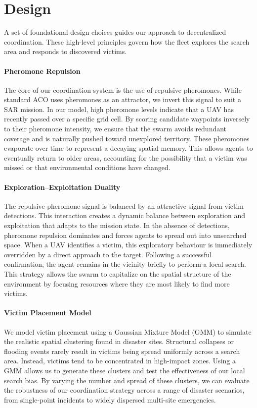 \section{Design}

A set of foundational design choices guides our approach to decentralized coordination. These high-level principles govern how the fleet explores the search area and responds to discovered victims.

\paragraph{Pheromone Repulsion}
The core of our coordination system is the use of repulsive pheromones. While standard ACO \citep{ar:Dorigo1996} uses pheromones as an attractor, we invert this signal to suit a SAR mission. In our model, high pheromone levels indicate that a UAV has recently passed over a specific grid cell. By scoring candidate waypoints inversely to their pheromone intensity, we ensure that the swarm avoids redundant coverage and is naturally pushed toward unexplored territory. These pheromones evaporate over time to represent a decaying spatial memory. This allows agents to eventually return to older areas, accounting for the possibility that a victim was missed or that environmental conditions have changed.

\paragraph{Exploration--Exploitation Duality}
The repulsive pheromone signal is balanced by an attractive signal from victim detections. This interaction creates a dynamic balance between exploration and exploitation that adapts to the mission state. In the absence of detections, pheromone repulsion dominates and forces agents to spread out into unsearched space. When a UAV identifies a victim, this exploratory behaviour is immediately overridden by a direct approach to the target. Following a successful confirmation, the agent remains in the vicinity briefly to perform a local search. This strategy allows the swarm to capitalize on the spatial structure of the environment by focusing resources where they are most likely to find more victims.

\paragraph{Victim Placement Model}
\label{sec:design_victim}
We model victim placement using a Gaussian Mixture Model (GMM) to simulate the realistic spatial clustering found in disaster sites. Structural collapses or flooding events rarely result in victims being spread uniformly across a search area. Instead, victims tend to be concentrated in high-impact zones. Using a GMM allows us to generate these clusters and test the effectiveness of our local search bias. By varying the number and spread of these clusters, we can evaluate the robustness of our coordination strategy across a range of disaster scenarios, from single-point incidents to widely dispersed multi-site emergencies.
